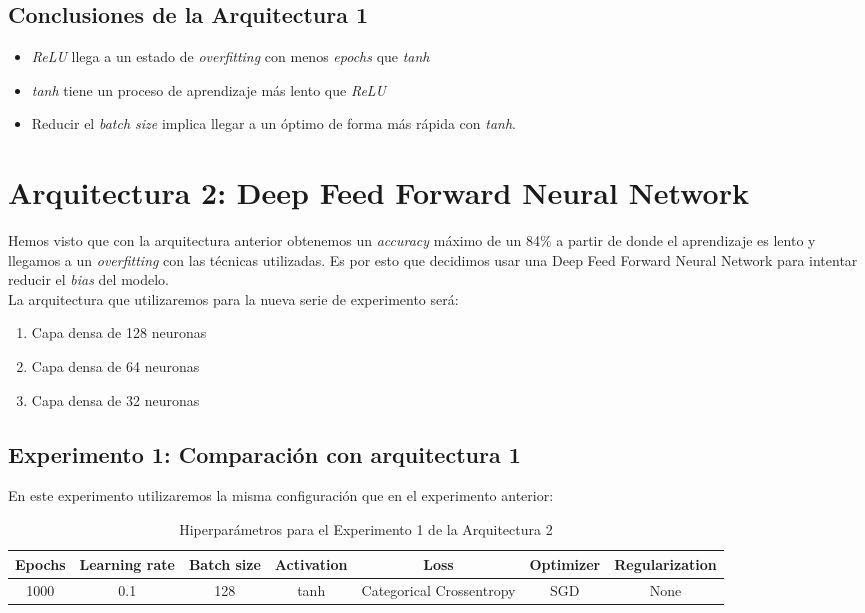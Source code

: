 \documentclass{article}
\begin{document}
		\subsection{Conclusiones de la Arquitectura 1}
		\label{d-cl-a1}
			\begin{itemize}
				\item \textit{ReLU} llega a un estado de \textit{overfitting} con menos \textit{epochs} que \textit{tanh}
				\item \textit{tanh} tiene un proceso de aprendizaje m\'as lento que \textit{ReLU}
				\item Reducir el \textit{batch size} implica llegar a un \'optimo de forma m\'as r\'apida con \textit{tanh}.
			\end{itemize}
			
	\section{Arquitectura 2: Deep Feed Forward Neural Network}
	\label{d-s-a2}
		Hemos visto que con la arquitectura anterior obtenemos un \textit{accuracy} m\'aximo de un 84\% a partir de donde el aprendizaje es lento y llegamos a un \textit{overfitting} con las t\'ecnicas utilizadas. Es por esto que decidimos usar una Deep Feed Forward Neural Network para intentar reducir el \textit{bias} del modelo.\\
		La arquitectura que utilizaremos para la nueva serie de experimento ser\'a:
		
		\begin{enumerate}
			\item Capa densa de 128 neuronas
			\item Capa densa de 64 neuronas
			\item Capa densa de 32 neuronas
		\end{enumerate}
		
		\subsection{Experimento 1: Comparaci\'on con arquitectura 1}
		\label{d-s-a2-e1}
			En este experimento utilizaremos la misma configuraci\'on que en el experimento anterior:
			\begin{table}[!h]
				\begin{center}
					\begin{tabular}{| c | c | c | c | c | c | c |}
						\textbf{Epochs} & \textbf{Learning rate} & \textbf{Batch size} & \textbf{Activation} & \textbf{Loss} & \textbf{Optimizer} & \textbf{Regularization} \\ \hline
						1000 & 0.1 & 128 & tanh & Categorical Crossentropy & SGD & None
					\end{tabular}
					\caption{Hiperpar\'ametros para el Experimento 1 de la Arquitectura 2}
					\label{tab:hip-d-a2-e1}
				\end{center}
			\end{table}
			
\end{document}
